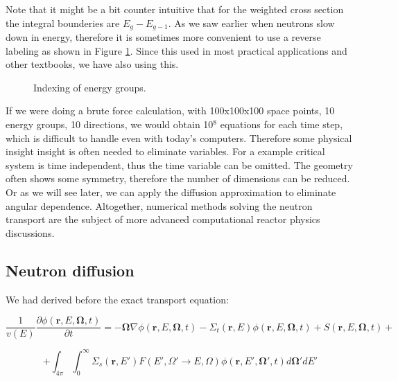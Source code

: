 Note that it might be a bit counter intuitive that for the weighted cross section the integral bounderies are $E_g - E_{g-1}$. As we saw earlier when neutrons slow down in energy, therefore it is sometimes more convenient to use a reverse labeling as shown in Figure \ref{fig:energygroups}. Since this used in most practical applications and other textbooks, we have also using this.

\begin{figure}[ht!]
\protect {}\protect
\caption{\label{fig:energygroups} \footnotesize{Indexing of energy groups.}}
\end{figure} 


If we were doing a brute force calculation, with 100x100x100 space points, 10 energy groups, 10 directions, we would obtain 10$^8$ equations for each time step, which is difficult to handle even with today's computers. Therefore some physical insight insight is often needed to eliminate variables. For a example critical system is time independent, thus the time variable can be omitted. The geometry often shows some symmetry, therefore the number of dimensions can be reduced. Or as we will see later, we can apply the diffusion approximation to eliminate angular dependence. Altogether, numerical methods solving the neutron transport are the subject of more advanced computational reactor physics discussions.

\subsection{Neutron diffusion}

We had derived before the exact transport equation:

\begin{equation}
\frac{1}{v(E)}\frac{\partial\phi(\mathbf{r},E,\mathbf{\Omega},t)}{\partial t}=-\mathbf{\Omega}\nabla\phi(\mathbf{r},E,\mathbf{\Omega},t)-\Sigma_t(\mathbf{r},E)\phi(\mathbf{r},E,\mathbf{\Omega},t)+S(\mathbf{r},E,\mathbf{\Omega},t) +
\end{equation}

\begin{equation*}
+\int_{4\pi}\int_{0}^\infty \Sigma_s(\mathbf{r},E')F(E',\Omega' \rightarrow E,\Omega)\phi(\mathbf{r},E',\mathbf{\Omega'},t)d\mathbf{\Omega'}dE'
\end{equation*}

